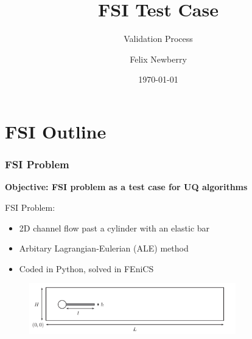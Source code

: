\documentclass{beamer}
\title{FSI Test Case}
\subtitle{Validation Process}
\author[Felix Newberry]{Felix Newberry\\  }
\date[\today]{\today}
\institute[CU]{University of Colorado Boulder - Aerospace Engineering}
\begin{document}
\frame{\titlepage}







\section{FSI Outline}

\begin{frame}[fragile]
\frametitle{FSI Problem }


\textbf{Objective: FSI problem as a test case for UQ algorithms}

FSI Problem:
\begin{itemize}
\item 2D channel flow past a cylinder with an elastic bar
\item Arbitary Lagrangian-Eulerian (ALE) method
\item Coded in Python, solved in FEniCS
\end{itemize}

\begin{figure}[h]
\centering
	\includegraphics[width=0.8\textwidth]{domain}
	\label{fig:domain}
\end{figure}
\end{frame}
\end{document}
